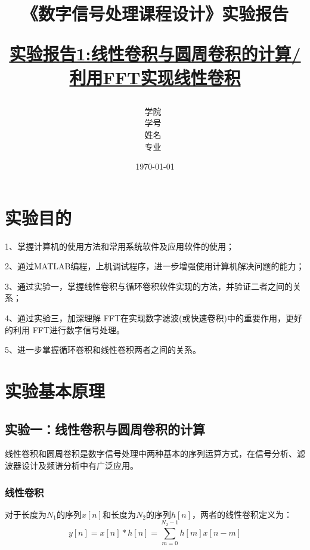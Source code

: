 \documentclass[12pt,hyperref,a4paper,UTF8]{ctexart}
\title{ 
        \vspace{1cm}
        \heiti \Huge \textbf{《数字信号处理课程设计》实验报告} \par
        \vspace{1cm} 
        \heiti \Large {\underline{实验报告1:线性卷积与圆周卷积的计算/利用FFT实现线性卷积}   } 
        \vspace{3cm}
    
    }
\author{
        \vspace{0.5cm}
        \kaishu\Large 学院\ \dlmu[9cm]{卓越学院} \\ %
        \vspace{0.5cm}
        \kaishu\Large 学号\ \dlmu[9cm]{23040447} \\ %
        \vspace{0.5cm}
        \kaishu\Large 姓名\ \dlmu[9cm]{陈文轩} \qquad  \\ %
        \vspace{0.5cm}
        \kaishu\Large 专业\ \dlmu[9cm]{智能硬件与系统(电子信息工程)} \qquad \\ %
    }
\date{\today} %
\begin{document}
\cover
\thispagestyle{empty} %







\newpage
\setcounter{page}{1} %

\section{实验目的}
1、掌握计算机的使用方法和常用系统软件及应用软件的使用；

2、通过MATLAB编程，上机调试程序，进一步增强使用计算机解决问题的能力；

3、通过实验一，掌握线性卷积与循环卷积软件实现的方法，并验证二者之间的关系；

4、通过实验三，加深理解 FFT在实现数字滤波(或快速卷积)中的重要作用，更好的利用 FFT进行数字信号处理。

5、进一步掌握循环卷积和线性卷积两者之间的关系。


\section{实验基本原理}
\subsection{实验一：线性卷积与圆周卷积的计算}

线性卷积和圆周卷积是数字信号处理中两种基本的序列运算方式，在信号分析、滤波器设计及频谱分析中有广泛应用。

\subsubsection{线性卷积}
对于长度为$N_1$的序列$x[n]$和长度为$N_2$的序列$h[n]$，两者的线性卷积定义为：
\begin{equation}
y[n] = x[n] * h[n] = \sum_{m=0}^{N_2-1} h[m]x[n-m]
\end{equation}
\end{document}
